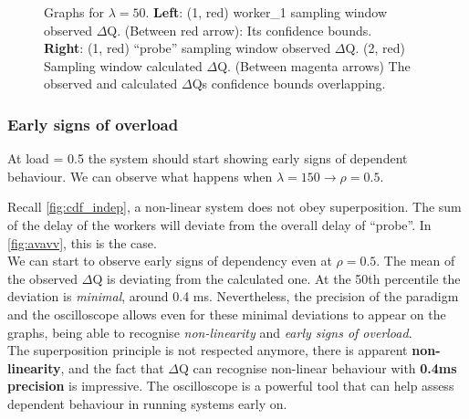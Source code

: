 \begin{figure}[H]
\begin{subfigure}{.5\textwidth}
                \label{fig:norm_ex_2}
            \end{subfigure}
            \caption{Graphs for $\lambda = 50$. \textbf{Left}: (1, red) worker\_1 sampling window observed $\Delta$Q. (Between red arrow): Its confidence bounds. \\
            \textbf{Right}: (1, red) ``probe'' sampling window observed $\Delta$Q. (2, red) Sampling window calculated $\Delta$Q. (Between magenta arrows) The observed and calculated $\Delta$Qs confidence bounds overlapping.}
            \label{fig:norm_ex}
        \end{figure}
    
\subsubsection{Early signs of overload}
    
    At load = 0.5 the system should start showing early signs of dependent behaviour. We can observe what happens when $\lambda = 150 \rightarrow \rho = 0.5$.
    
    Recall \cref{fig:cdf_indep}, a non-linear system does not obey superposition. The sum of the delay of the workers will deviate from the overall delay of ``probe''. In \cref{fig:avavv}, this is the case. \\
    We can start to observe early signs of dependency even at $\rho = 0.5$. The mean of the observed $\Delta$Q is deviating from the calculated one. At the 50th percentile the deviation is \textit{minimal}, around 0.4 ms. Nevertheless, the precision of the paradigm and the oscilloscope allows even for these minimal deviations to appear on the graphs, being able to recognise \textit{non-linearity} and \textit{early signs of overload}. \\
    The superposition principle is not respected anymore, there is apparent \textbf{non-linearity}, and the fact that $\Delta$Q can recognise non-linear behaviour with \textbf{0.4ms precision} is impressive. The oscilloscope is a powerful tool that can help assess dependent behaviour in running systems early on.
 
